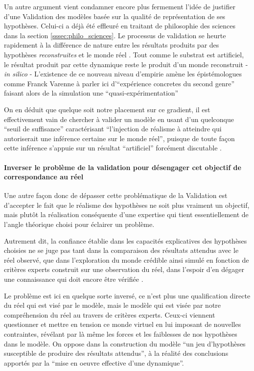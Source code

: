 Un autre argument vient condamner encore plus fermement l'idée de justifier d'une Validation des modèles basée sur la qualité de représentation de ses hypothèses. Celui-ci a déjà été effleuré en traitant de philosophie des sciences dans la section \ref{sssec:philo_sciences}. Le processus de validation se heurte rapidement à la différence de nature entre les résultats produits par des hypothèses \textit{reconstruites} et le monde réel . Tout comme le substrat est artificiel, le résultat produit par cette dynamique reste le produit d'un monde reconstruit - \textit{in silico} - L'existence de ce nouveau niveau d'empirie amène les épistémologues comme Franck Varenne à parler ici d'\enquote{expérience concretes du second genre} faisant alors de la simulation une \enquote{quasi-expérimentation} \autocites{Varenne2001, Varenne2007, Phan2008}

On en déduit que quelque soit notre placement sur ce gradient, il est effectivement vain de chercher à valider un modèle en usant d'un quelconque \enquote{seuil de suffisance} caractérisant \enquote{l'injection de réalisme à atteindre qui autoriserait une inférence certaine sur le monde réel}, puisque de toute façon cette inférence s'appuie sur un résultat \enquote{artificiel} forcément discutable .

\paragraph{Inverser le problème de la validation pour désengager cet objectif de correspondance au réel}
\label{p:inverser_problematique}

Une autre façon donc de dépasser cette problématique de la Validation est d'accepter le fait que le réalisme des hypothèses ne soit plus vraiment un objectif, mais plutôt la réalisation conséquente d'une expertise qui tient essentiellement de l'angle théorique choisi pour éclairer un problème.

Autrement dit, la confiance établie dans les capacités explicatives des hypothèses choisies ne se juge pas tant dans la comparaison des résultats attendus avec le réel observé, que dans l'exploration du monde crédible ainsi simulé en fonction de critères experts construit sur une observation du réel, dans l'espoir d'en dégager une connaissance qui doit encore être vérifiée . 

Le problème est ici en quelque sorte inversé, ce n'est plus une qualification directe du réel qui est visé par le modèle, mais le modèle qui est visée par notre compréhension du réel au travers de critères experts. Ceux-ci viennent questionner et mettre en tension ce monde virtuel en lui imposant de nouvelles contraintes, révélant par là même les forces et les faiblesses de nos hypothèses dans le modèle. On oppose dans la construction du modèle \enquote{un jeu d'hypothèses susceptible de produire des résultats attendus}, à la réalité des conclusions apportés par la \enquote{mise en oeuvre effective d'une dynamique}.

